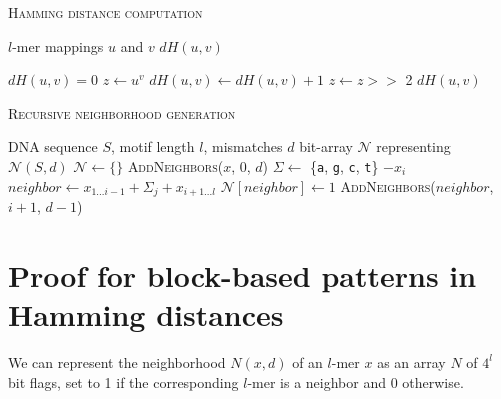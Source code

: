 \documentclass[oneside,12pt]{DISCSthesis}
\begin{document}
		\newpage
		{\small

			\noindent \hspace*{6pt}{\bf Algorithm 2} \textsc{Hamming distance computation}\vspace*{6pt}
			\begin{algorithmic}[1]\label{alg:hamming-distance-comp}
				\Require $l$-mer mappings $u$ and $v$
				\Ensure $dH(u,v)$\vspace*{6pt}

				\State $dH(u,v) = 0$
				\State $z \leftarrow u ^ v$
				\State $dH(u,v) \leftarrow dH(u,v) + 1$
				\EndIf
				\State $z \leftarrow z >>$ 2
				\EndFor
				\State\Return $dH(u,v)$
				\end{algorithmic}

			\bigskip\bigskip\bigskip\bigskip

			\noindent \hspace*{6pt}{\bf Algorithm 3} \textsc{Recursive neighborhood generation}
			\begin{algorithmic}[1]
				\label{alg:recursive-nbr-gen}
				\Require DNA sequence $S$, motif length $l$, mismatches $d$
				\Ensure bit-array $\mathcal{N}$ representing $\mathcal{N}(S,d)$ \vspace*{6pt}
				\State $\mathcal{N}\leftarrow \{\}$
				\State \textsc{AddNeighbors}($x$, 0, $d$) \hspace*{9pt}
				\EndFor
				\State {}
						\State $\Sigma \leftarrow$ \{\texttt{a}, \texttt{g}, \texttt{c}, \texttt{t}\} $- x_{i}$ \hspace*{6pt}
							\State $neighbor \leftarrow x_{1...i-1} + \Sigma_{j} + x_{i+1...l}$
							\State $\mathcal{N}[neighbor] \leftarrow 1$
								\State \textsc{AddNeighbors}($neighbor$, $i+1$, $d-1$)
							\EndIf
						\EndFor
					\EndFor
				\EndProcedure
				\end{algorithmic}
			}

	\newpage
	\section{Proof for block-based patterns in Hamming distances}
		We can represent the neighborhood $N(x,d)$ of an $l$-mer $x$ as an array $N$ of $4^{l}$ bit flags, set to 1 if the corresponding $l$-mer is a neighbor and 0 otherwise.
		
\end{document}
